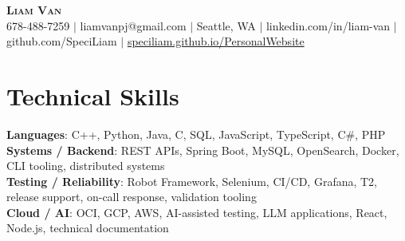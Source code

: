 \documentclass[letterpaper,11pt]{article}
\begin{document}

%
\begin{center}
    \textbf{\Huge \scshape Liam Van} \\ \vspace{1pt}
    \small 678-488-7259 $|$ \small {liamvanpj@gmail.com} $|$ Seattle, WA
 {{$|$ linkedin.com/in/liam-van} {$|$ github.com/SpeciLiam} {$|$ \href{https://speciliam.github.io/PersonalWebsite}{speciliam.github.io/PersonalWebsite}}}

\end{center}

\section{Technical Skills}
 \begin{itemize}[leftmargin=0.15in, label={}]
    \small{\item{
     \textbf{Languages}{: C++, Python, Java, C, SQL, JavaScript, TypeScript, C\#, PHP} \\
     \textbf{Systems / Backend}{: REST APIs, Spring Boot, MySQL, OpenSearch, Docker, CLI tooling, distributed systems} \\
     \textbf{Testing / Reliability}{: Robot Framework, Selenium, CI/CD, Grafana, T2, release support, on-call response, validation tooling} \\
     \textbf{Cloud / AI}{: OCI, GCP, AWS, AI-assisted testing, LLM applications, React, Node.js, technical documentation} \\
    }}
 \end{itemize}
%
\end{document}
